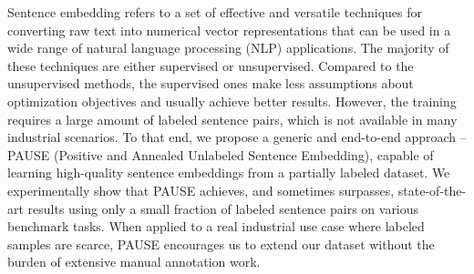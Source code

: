Sentence embedding refers to a set of effective and versatile techniques for converting raw text into numerical vector representations that can be used in a wide range of natural language processing (NLP) applications. The majority of these techniques are either supervised or unsupervised. Compared to the unsupervised methods, the supervised ones make less assumptions about optimization objectives and usually achieve better results. However, the training requires a large amount of labeled sentence pairs, which is not available in many industrial scenarios. To that end, we propose a generic and end-to-end approach -- PAUSE (Positive and Annealed Unlabeled Sentence Embedding), capable of learning high-quality sentence embeddings from a partially labeled dataset. We experimentally show that PAUSE achieves, and sometimes surpasses, state-of-the-art results using only a small fraction of labeled sentence pairs on various benchmark tasks. When applied to a real industrial use case where labeled samples are scarce, PAUSE encourages us to extend our dataset without the burden of extensive manual annotation work.
